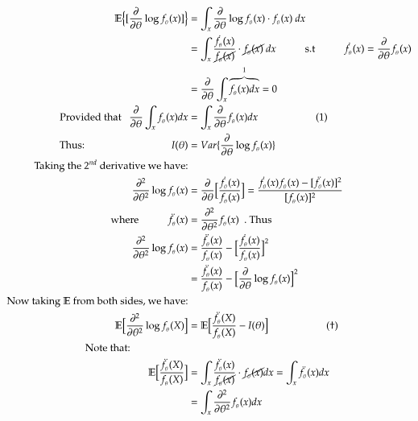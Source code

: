 \documentclass[14pt,twoside,a4paper,fleqn]{article}
\theoremstyle{plain}
\begin{document}
\begin{equation*}
\begin{split}
\mathbb{E}\big\{[\frac{\partial}{\partial\theta}\log f_{_\theta}(x)]\big\} 
	&=	\int_{x} \frac{\partial}{\partial\theta} \log f_{_\theta}(x)\cdot f_{_\theta}(x)\ dx \\
	&= \int_x \frac{\dot{f}_{_\theta}(x)}{\cancel{f_{_\theta}(x)}}\cdot\cancel{f_{_\theta}(x)}\ dx\tab\text{s.t}\tab\dot{f}_{_\theta}(x) = \frac{\partial}{\partial\theta}f_{_\theta}(x)\\
	&= \frac{\partial}{\partial\theta}\int_x\overbrace{f_{_\theta}(x) dx}^1 = 0\\
	\text{Provided that } \ \ \frac{\partial}{\partial\theta}\int_x f_{_\theta}(x) dx &= \int_x\frac{\partial}{\partial\theta}f_{_\theta}(x)dx\tab[2cm] (1)\\
	\text{Thus:}\tab[3cm] I(\theta) &= Var\{\frac{\partial}{\partial\theta}\log f_{_\theta}(x)\}\\	
	\text{Taking the $2^{nd}$ derivative we have:}\\
	\frac{\partial^2}{\partial\theta^2}\log f_{_\theta}(x) &= \frac{\partial}{\partial\theta}\big[\frac{\dot{f}_{_\theta}(x)}{f_{_\theta}(x)}\big] = \frac{\dot{f}_{_\theta}(x)f_{_\theta}(x)-[\ddot{f}_{_\theta}(x)]^2}{[f_{_\theta}(x)]^2}\\
	\text{where\tab} \ddot{f}_{_\theta}(x) &= \frac{\partial^2}{\partial\theta^2}f_{_\theta}(x)\ \ .\ \text{Thus}\\
	\frac{\partial^2}{\partial\theta^2}\log f_{_\theta}(x) &= \frac{\ddot{f}_{_\theta}(x)}{f_{_\theta}(x)} - \big[\frac{\dot{f}_{_\theta}(x)}{f_{_\theta}(x)}\big]^2\\
	&= \frac{\ddot{f}_{_\theta}(x)}{f_{_\theta}(x)} - \big[\frac{\partial}{\partial\theta}\log f_{_\theta}(x)\big]^2\\
	\text{Now taking $\mathbb{E}$ from both sides, we have:}\\
	\mathbb{E}\Big[ \frac{\partial^2}{\partial\theta^2}\log f_{_\theta}(X) \Big] &= \mathbb{E}\Big[\frac{\ddot{f}_{_\theta}(X)}{f_{_\theta}(X)}- I(\theta)\Big]\tab[2cm] (\dagger)\\
	\text{Note that:}\tab\tab&\\
	\mathbb{E}\big[\frac{\ddot{f}_{_\theta}(X)}{f_{_\theta}(X)}\big] &= \int_x \frac{\ddot{f}_{_\theta}(x)}{\cancel{f_{_\theta}(x)}} \cdot \cancel{f_{_\theta}(x)}dx =\int_x \ddot{f}_{_\theta}(x)dx\\
		&= \int_x \frac{\partial^2}{\partial\theta^2}f_{_\theta}(x)dx\\

\end{split}
\end{equation*}
\end{document}
